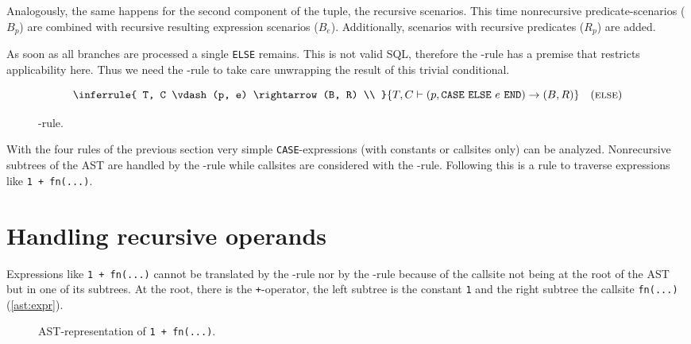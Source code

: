 Analogously, the same happens for the second component of the tuple, the recursive scenarios. This time nonrecursive predicate-scenarios ($B_p$) are combined with recursive resulting expression scenarios ($B_e$). Additionally, scenarios with recursive predicates ($R_p$) are added.

As soon as all branches are processed a single \texttt{ELSE} remains. This is not valid SQL, therefore the \RBASE-rule has a premise that restricts applicability here. Thus we need the \RELSE-rule to take care unwrapping the result of this trivial conditional.
\begin{figure}[h!]
    \centering\small
$$\inferrule{
    T, C \vdash (p, e) \rightarrow (B, R) \\
}{
    T, C \vdash (p, \CASE ~\ELSE ~e~ \END) \rightarrow (B, R)
}
\quad(\textsc{else})$$
    \caption{\RELSE-rule.}
    \label{fig:my_label}
\end{figure}

With the four rules of the previous section very simple \texttt{CASE}-expressions (with constants or callsites only) can be analyzed. Nonrecursive subtrees of the AST are handled by the \RBASE-rule while callsites are considered with the \RREC-rule. Following this is a rule to traverse expressions like \texttt{1 + fn(...)}.

\section{Handling recursive operands}

Expressions like \texttt{1 + fn(...)} cannot be translated by the \RBASE-rule nor by the \RREC-rule because of the callsite not being at the root of the AST but in one of its subtrees. At the root, there is the \texttt{+}-operator, the left subtree is the constant \texttt{1} and the right subtree the callsite \texttt{fn(...)} (\autoref{ast:expr}).

\begin{wrapfigure}{r}{.3\textwidth}
  \centering
  \caption{AST-representation of \texttt{1 + fn(...)}.}
  \label{ast:expr}
\end{wrapfigure}

